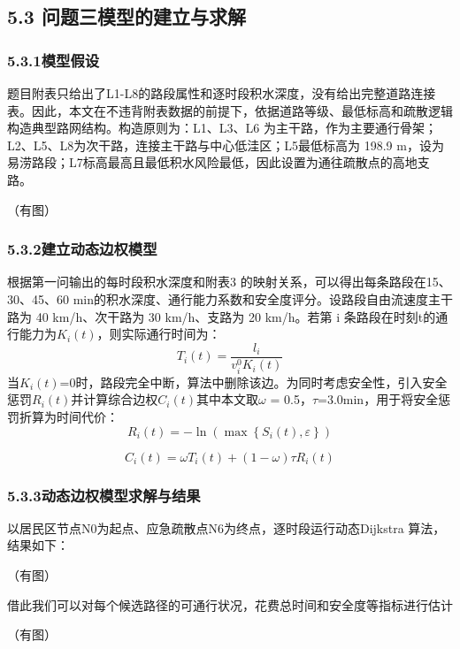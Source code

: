 \documentclass[UTF8,a4paper,12pt]{ctexart}
\begin{document}
\subsection{5.3 问题三模型的建立与求解}
\subsubsection{5.3.1模型假设}
题目附表只给出了L1-L8的路段属性和逐时段积水深度，没有给出完整道路连接表。因此，本文在不违背附表数据的前提下，依据道路等级、最低标高和疏散逻辑构造典型路网结构。构造原则为：L1、L3、L6 为主干路，作为主要通行骨架；L2、L5、L8为次干路，连接主干路与中心低洼区；L5最低标高为 198.9 m，设为易涝路段；L7标高最高且最低积水风险最低，因此设置为通往疏散点的高地支路。

（有图）

\subsubsection{5.3.2建立动态边权模型}

根据第一问输出的每时段积水深度和附表3 的映射关系，可以得出每条路段在15、30、45、60 min的积水深度、通行能力系数和安全度评分。设路段自由流速度主干路为 40 km/h、次干路为 30 km/h、支路为 20 km/h。若第 i 条路段在时刻t的通行能力为\(K_i(t)\)，则实际通行时间为：
\[
T_i(t) = \frac{l_i}{v_i^0 K_i(t)}
\]
当\(K_i(t)\)=0时，路段完全中断，算法中删除该边。为同时考虑安全性，引入安全惩罚\(R_i(t)\)并计算综合边权\(C_i(t)\)其中本文取\(\omega\) = 0.5，\(\tau\)=3.0min，用于将安全惩罚折算为时间代价：
\[
R_i(t) = -\ln\left(\max\left\{S_i(t), \varepsilon\right\}\right)
\]

\[
C_i(t) = \omega T_i(t) + (1 - \omega)\tau R_i(t)
\]

\subsubsection{5.3.3动态边权模型求解与结果}
以居民区节点N0为起点、应急疏散点N6为终点，逐时段运行动态Dijkstra 算法，结果如下：

（有图）

借此我们可以对每个候选路径的可通行状况，花费总时间和安全度等指标进行估计

（有图）
\end{document}
